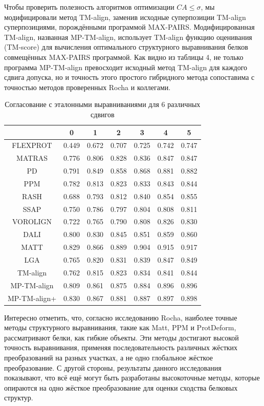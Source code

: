 \documentclass[a4paper]{extreport}
\begin{document}
Чтобы проверить полезность алгоритмов оптимизации $CA \leq \sigma$, мы модифицировали метод TM-align, заменив исходные суперпозиции TM-align суперпозициями, порождёнными программой MAX-PAIRS. Модифицированная TM-align, названная MP-TM-align, использует TM-align функцию оценивания (TM-score) для вычисления оптимального структурного выравнивания белков совмещённых MAX-PAIRS программой. Как видно из таблицы 4, не только программа MP-TM-align превосходит исходный метод TM-align для каждого сдвига допуска, но и точность этого простого гибридного метода сопоставима с точностью методов проверенных Rocha и коллегами.
\begin{table}
\caption{ Согласование с эталонными выравниваниями для 6 различных сдвигов}
\begin{center}
\begin{tabular}{|c|cccccc|}
\hline
&0&1&2&3&4&5\\
\hline
FLEXPROT&               0.449&  0.672&  0.707&  0.725&  0.742&  0.747\\
MATRAS&                 0.776&  0.806&  0.828&  0.836&  0.847&  0.847\\
PD&                             0.791&  0.849&  0.858&  0.868&  0.881&  0.882\\
PPM&                    0.782&  0.813&  0.823&  0.833&  0.843&  0.844\\
RASH&                   0.688&  0.793&  0.812&  0.840&  0.854&  0.855\\
SSAP&                   0.750&  0.786&  0.797&  0.804&  0.808&  0.811\\
VOROLIGN&               0.722&  0.765&  0.790&  0.808&  0.826&  0.830\\
DALI&                   0.800&  0.830&  0.845&  0.851&  0.859&  0.860\\
MATT&                   0.829&  0.866&  0.889&  0.904&  0.915&  0.917\\
LGA&                    0.765&  0.820&  0.831&  0.839&  0.847&  0.849\\
TM-align&               0.762&  0.815&  0.823&  0.834&  0.841&  0.844\\
MP-TM-align&    0.809&  0.861&  0.875&  0.884&  0.896&  0.896\\
MP-TM-align+&   0.830&  0.867&  0.881&  0.887&  0.897&  0.898\\
\hline
\end{tabular}
\end{center}
\end{table}

Интересно отметить, что, согласно исследованию Rocha, наиболее точные методы структурного выравнивания, такие как Matt, PPM и ProtDeform, рассматривают белки, как гибкие объекты. Эти методы достигают высокой точность выравнивания, применяя последовательность различных жёстких преобразований на разных участках, а не одно глобальное жёсткое преобразование. С другой стороны, результаты данного исследования показывают, что всё ещё могут быть разработаны высокоточные методы, которые опираются на одно жёсткое преобразование для оценки сходства белковых структур.
\end{document}
